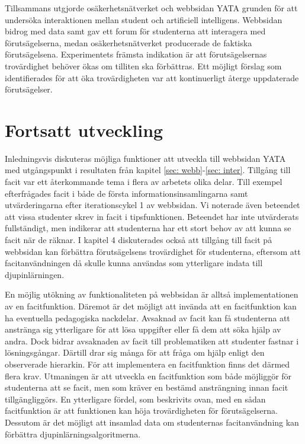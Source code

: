 Tillsammans utgjorde osäkerhetsnätverket och webbsidan YATA grunden för att undersöka interaktionen mellan student och artificiell intelligens. Webbsidan bidrog med data samt gav ett forum för studenterna att interagera med förutsägelserna, medan osäkerhetsnätverket producerade de faktiska förutsägelsena. Experimentets främsta indikation är att förutsägelsernas trovärdighet behöver ökas om tilliten ska förbättras. Ett möjligt förslag som identifierades för att öka trovärdigheten var att kontinuerligt återge uppdaterade förutsägelser.

\section{Fortsatt utveckling}
\label{sec:future}
Inledningsvis diskuteras möjliga funktioner att utveckla till webbsidan YATA med utgångspunkt i resultaten från kapitel \ref{sec: webb}-\ref{sec: inter}. Tillgång till facit var ett återkommande tema i flera av arbetets olika delar. Till exempel efterfrågades facit i både de första informationsinsamlingarna samt utvärderingarna efter iterationscykel 1 av webbsidan. Vi noterade även beteendet att vissa studenter skrev in facit i tipsfunktionen. Beteendet har inte utvärderats fullständigt, men indikerar att studenterna har ett stort behov av att kunna se facit när de räknar. I kapitel 4 diskuterades också att tillgång till facit på webbsidan kan förbättra förutsägelsens trovärdighet för studenterna, eftersom att facitanvändningen då skulle kunna användas som ytterligare indata till djupinlärningen.

En möjlig utökning av funktionaliteten på webbsidan är alltså implementationen av en facitfunktion. Däremot är det möjligt att invända att en facitfunktion kan ha eventuella pedagogiska nackdelar. Avsaknad av facit kan få studenterna att anstränga sig ytterligare för att lösa uppgifter eller få dem att söka hjälp av andra. Dock bidrar avsaknaden av facit till problematiken att studenter fastnar i lösningsgångar. Därtill drar sig många för att fråga om hjälp enligt den observerade hierarkin. För att implementera en facitfunktion finns det därmed flera krav. Utmaningen är att utveckla en facitfunktion som både möjliggör för studenterna att se facit, men som kräver en bestämd ansträngning innan facit tillgängliggörs. En ytterligare fördel, som beskrivits ovan, med en sådan facitfunktion är att funktionen kan höja trovärdigheten för förutsägelserna. Dessutom är det möjligt att insamlad data om studenternas facitanvändning kan förbättra djupinlärningsalgoritmerna.

